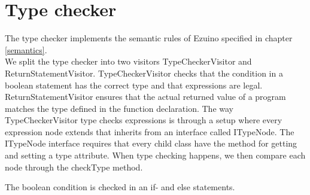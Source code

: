 \section{Type checker}
The type checker implements the semantic rules of Ezuino specified in chapter \ref{semantics}. \\
We split the type checker into two visitors TypeCheckerVisitor and ReturnStatementVisitor. TypeCheckerVisitor checks that the condition in a boolean statement has the correct type and that expressions are legal. ReturnStatementVisitor ensures that the actual returned value of a program matches the type defined in the function declaration.
The way TypeCheckerVisitor type checks expressions is through a setup where every expression node extends that inherits from an interface called ITypeNode. The ITypeNode interface requires that every child class have the method for getting and setting a type attribute. When type checking happens, we then compare each node through the checkType method.
\begin{figure}[H]
\centering
{}
\caption{}
\label{dadsa}
\end{figure}

The boolean condition is checked in an if- and else statements.
 \begin{figure}[H]
\centering
{}
\caption{}
\label{lf05}
\end{figure}

